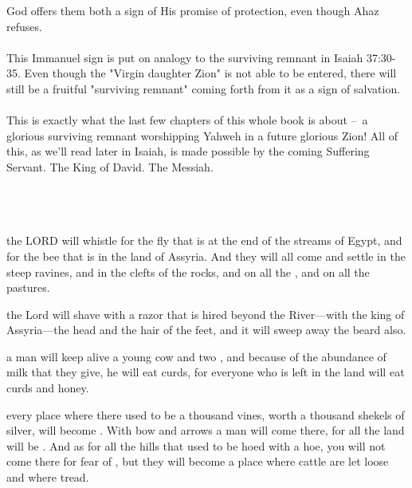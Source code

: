 \documentclass[11pt]{article}
\begin{document}
God offers them both a sign of His promise of protection, even though Ahaz refuses.
\\\\
This Immanuel sign is put on analogy to the surviving remnant in Isaiah 37:30-35. Even though the "Virgin daughter Zion" is not able to be entered, there will still be a fruitful "surviving remnant" coming forth from it as a sign of salvation.
\\\\
This is exactly what the last few chapters of this whole book is about – a glorious surviving remnant worshipping Yahweh in a future glorious Zion! All of this, as we'll read later in Isaiah, is made possible by the coming Suffering Servant. The King of David. The Messiah.
\\\\\\\\

\begin{biblicaloutline}[Isaiah 7:18-25]

    \begin{versesection}{2em}
          the LORD will whistle for the fly that is at the end of the streams of Egypt, and for the bee that is in the land of Assyria.  And they will all come and settle in the steep ravines, and in the clefts of the rocks, and on all the , and on all the pastures.
        
          the Lord will shave with a razor that is hired beyond the River—with the king of Assyria—the head and the hair of the feet, and it will sweep away the beard also.

          a man will keep alive a young cow and two ,  and because of the abundance of milk that they give, he will eat curds, for everyone who is left in the land will eat curds and honey.
        
          every place where there used to be a thousand vines, worth a thousand shekels of silver, will become .  With bow and arrows a man will come there, for all the land will be .  And as for all the hills that used to be hoed with a hoe, you will not come there for fear of , but they will become a place where cattle are let loose and where  tread.
    \end{versesection}

\end{biblicaloutline}
\end{document}
